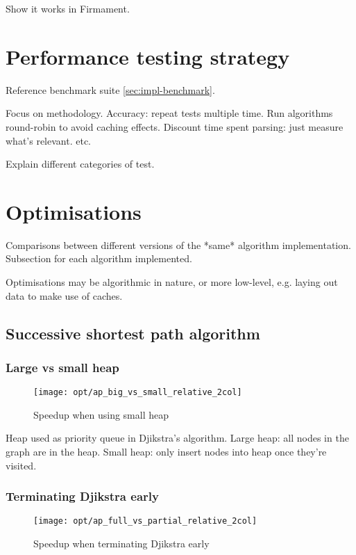 Show it works in Firmament.

\section{Performance testing strategy} \label{sec:eval-benchmark-strategy}

Reference benchmark suite \ref{sec:impl-benchmark}. 

Focus on methodology. Accuracy: repeat tests multiple time. Run algorithms round-robin to avoid caching effects. Discount time spent parsing: just measure what's relevant. etc.

Explain different categories of test.

\section{Optimisations} \label{sec:eval-optimisations}

Comparisons between different versions of the *same* algorithm implementation. Subsection for each algorithm implemented.

Optimisations may be algorithmic in nature, or more low-level, e.g. laying out data to make use of caches.

\subsection{Successive shortest path algorithm}

\subsubsection{Large vs small heap}

\begin{figure}
  \centering
  \texttt{[image: opt/ap\_big\_vs\_small\_relative\_2col]}
  \caption{Speedup when using small heap}
  \label{fig:opt-ap-big-vs-small}
\end{figure}

Heap used as priority queue in Djikstra's algorithm. Large heap: all nodes in the graph are in the heap. Small heap: only insert nodes into heap once they're visited.

\subsubsection{Terminating Djikstra early}

\begin{figure}
    \centering
    \texttt{[image: opt/ap\_full\_vs\_partial\_relative\_2col]}
    \caption{Speedup when terminating Djikstra early}
    \label{fig:opt-ap-terminate-djikstra-early}
\end{figure}

